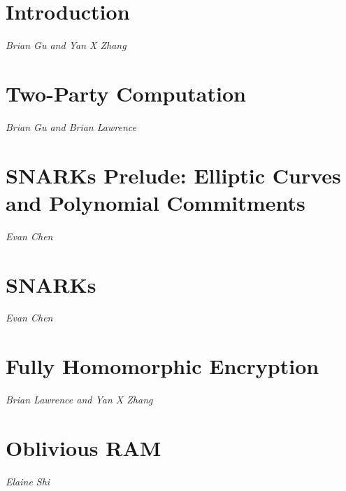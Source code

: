 \documentclass{article}
\theoremstyle{plain}
\theoremstyle{definition}
\begin{document}
\tableofcontents

\newpage
\section{Introduction}
\emph{Brian Gu and Yan X Zhang}
\vspace{1in}


\newpage
\section{Two-Party Computation}
\emph{Brian Gu and Brian Lawrence}
\vspace{1in}




\newpage
\section{SNARKs Prelude: Elliptic Curves and Polynomial Commitments}
\emph{Evan Chen}
\vspace{1in}





\newpage
\section{SNARKs}
\emph{Evan Chen}
\vspace{1in}






\newpage
\section{Fully Homomorphic Encryption}
\emph{Brian Lawrence and Yan X Zhang}
\vspace{1in}






\newpage
\section{Oblivious RAM}
\emph{Elaine Shi}
\vspace{1in}


\end{document}
